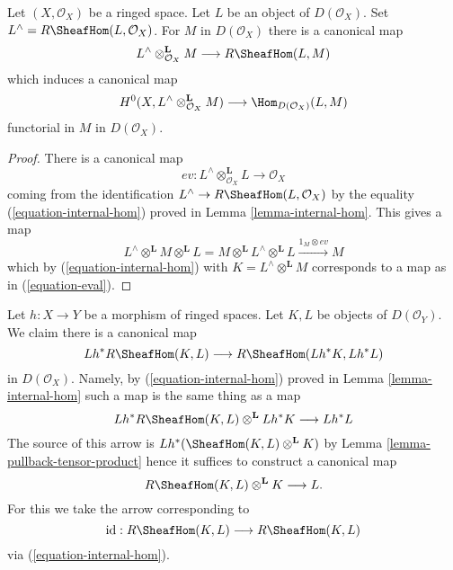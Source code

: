 \begin{lemma}
\label{lemma-dual}
Let $(X, \mathcal{O}_X)$ be a ringed space. Let $L$ be an
object of $D(\mathcal{O}_X)$. Set $L^\wedge = R\SheafHom(L, \mathcal{O}_X)$.
For $M$ in $D(\mathcal{O}_X)$ there is a canonical map
\begin{equation}
\label{equation-eval}
L^\wedge \otimes^\mathbf{L}_{\mathcal{O}_X} M
\longrightarrow
R\SheafHom(L, M)
\end{equation}
which induces a canonical map
$$
H^0(X, L^\wedge \otimes_{\mathcal{O}_X}^\mathbf{L} M)
\longrightarrow
\Hom_{D(\mathcal{O}_X)}(L, M)
$$
functorial in $M$ in $D(\mathcal{O}_X)$.
\end{lemma}

\begin{proof}
There is a canonical map
$$
ev :
L^\wedge \otimes^\mathbf{L}_{\mathcal{O}_X} L
\longrightarrow
\mathcal{O}_X
$$
coming from the identification $L^\wedge \to R\SheafHom(L, \mathcal{O}_X)$
by the equality (\ref{equation-internal-hom}) proved in
Lemma \ref{lemma-internal-hom}. This gives a map
$$
L^\wedge \otimes^\mathbf{L} M \otimes^\mathbf{L} L =
M \otimes^\mathbf{L} L^\wedge \otimes^\mathbf{L} L
\xrightarrow{1_M \otimes ev}
M
$$
which by (\ref{equation-internal-hom}) with $K = L^\wedge \otimes^\mathbf{L} M$
corresponds to a map as in (\ref{equation-eval}).
\end{proof}

\begin{remark}
\label{remark-prepare-fancy-base-change}
Let $h : X \to Y$ be a morphism of ringed spaces.
Let $K, L$ be objects of $D(\mathcal{O}_Y)$. We claim there is a
canonical map
$$
Lh^*R\SheafHom(K, L) \longrightarrow R\SheafHom(Lh^*K, Lh^*L)
$$
in $D(\mathcal{O}_X)$. Namely, by (\ref{equation-internal-hom})
proved in Lemma \ref{lemma-internal-hom}
such a map is the same thing as a map
$$
Lh^*R\SheafHom(K, L) \otimes^\mathbf{L} Lh^*K \longrightarrow Lh^*L
$$
The source of this arrow is $Lh^*(\SheafHom(K, L) \otimes^\mathbf{L} K)$
by Lemma \ref{lemma-pullback-tensor-product}
hence it suffices to construct a canonical map
$$
R\SheafHom(K, L) \otimes^\mathbf{L} K \longrightarrow L.
$$
For this we take the arrow corresponding to
$$
\text{id} :
R\SheafHom(K, L)
\longrightarrow
R\SheafHom(K, L)
$$
via (\ref{equation-internal-hom}).
\end{remark}

